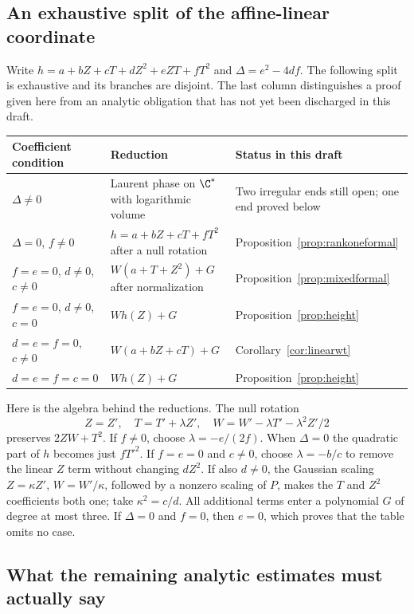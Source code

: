 \subsection{An exhaustive split of the affine-linear coordinate}\label{sec:wsplit}

Write $h=a+bZ+cT+dZ^2+eZT+fT^2$ and
$\Delta=e^2-4df$. The following split is exhaustive and its branches
are disjoint. The last column distinguishes a proof given here from
an analytic obligation that has not yet been discharged in this draft.

\begin{center}\small
\begin{tabular}{@{}p{}p{}p{}@{}}
\toprule
Coefficient condition & Reduction & Status in this draft\\
\midrule
$\Delta\ne0$ & Laurent phase on $\C^*$ with logarithmic volume &
Two irregular ends still open; one end proved below\\[3pt]
$\Delta=0$, $f\ne0$ & $h=a+bZ+cT+fT^2$ after a null rotation &
Proposition~\ref{prop:rankoneformal}\\[3pt]
$f=e=0$, $d\ne0$, $c\ne0$ &
$W(a+T+Z^2)+G$ after normalization &
Proposition~\ref{prop:mixedformal}\\[3pt]
$f=e=0$, $d\ne0$, $c=0$ & $Wh(Z)+G$ &
Proposition~\ref{prop:height}\\[3pt]
$d=e=f=0$, $c\ne0$ & $W(a+bZ+cT)+G$ &
Corollary~\ref{cor:linearwt}\\[3pt]
$d=e=f=c=0$ & $Wh(Z)+G$ &
Proposition~\ref{prop:height}\\
\bottomrule
\end{tabular}
\end{center}

Here is the algebra behind the reductions. The null rotation
\[
 Z=Z',\quad T=T'+\lambda Z',\quad
 W=W'-\lambda T'-\lambda^2Z'/2
\]
preserves $2ZW+T^2$. If $f\ne0$, choose $\lambda=-e/(2f)$.
When $\Delta=0$ the quadratic part of $h$ becomes just $fT'^2$.
If $f=e=0$ and $c\ne0$, choose $\lambda=-b/c$ to remove the
linear $Z$ term without changing $dZ^2$. If also $d\ne0$, the
Gaussian scaling $Z=\kappa Z'$, $W=W'/\kappa$, followed by a
nonzero scaling of $P$, makes the $T$ and $Z^2$ coefficients both
one; take $\kappa^2=c/d$. All additional terms enter a polynomial
$G$ of degree at most three. If $\Delta=0$ and $f=0$, then $e=0$,
which proves that the table omits no case.

\subsection{What the remaining analytic estimates must actually say}
\label{sec:analyticgates}


